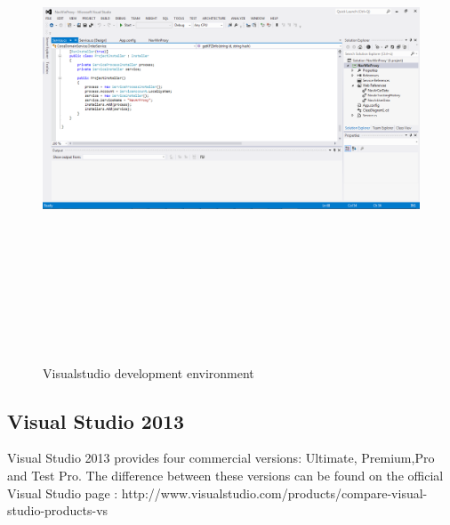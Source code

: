 \begin{figure}[htbp]
\centering
\includegraphics[width=140mm,height=150mm,keepaspectratio]{graphics/visualstudio.PNG}
\caption{Visualstudio development environment\cite{ajax}}
\end{figure}


\subsection{Visual Studio 2013}
Visual Studio 2013 provides four commercial versions: Ultimate, Premium,Pro and Test Pro. The difference between these versions can be found on the official Visual Studio page : http://www.visualstudio.com/products/compare-visual-
\\
studio-products-vs
\newpage
